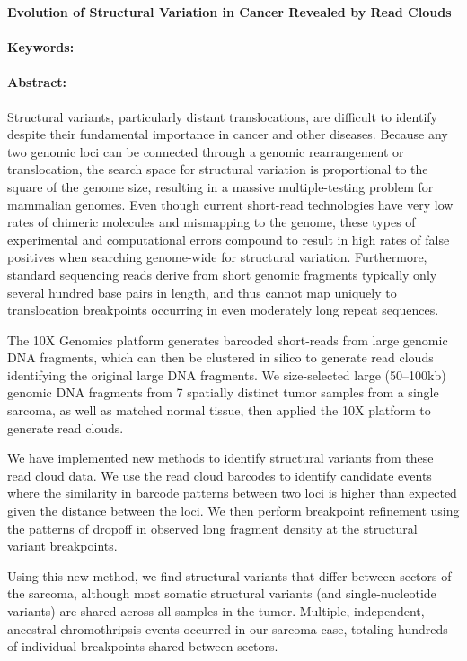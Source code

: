 \noindent
\large {\bf Evolution of Structural Variation in Cancer Revealed by Read Clouds} 


\normalsize 


\noindent \paragraph{Keywords:} 

\noindent \paragraph{Abstract:} 


Structural variants, particularly distant translocations, are
difficult to identify despite their fundamental importance in cancer and
other diseases. Because any two genomic loci can be connected through
a genomic rearrangement or translocation, the search space for structural
variation is proportional to the square of the genome size, resulting in a
massive multiple-testing problem for mammalian genomes. Even though
current short-read technologies have very low rates of chimeric molecules
and mismapping to the genome, these types of experimental and computational errors compound to result in high rates of false positives when
searching genome-wide for structural variation. Furthermore, standard sequencing reads derive from short genomic fragments typically only several
hundred base pairs in length, and thus cannot map uniquely to translocation
breakpoints occurring in even moderately long repeat sequences.

The 10X Genomics platform generates barcoded short-reads from
large genomic DNA fragments, which can then be clustered in silico to generate read clouds identifying the original large DNA fragments. We size-selected large (50–100kb) genomic DNA fragments from 7 spatially distinct
tumor samples from a single sarcoma, as well as matched normal tissue, then
applied the 10X platform to generate read clouds.

We have implemented new methods to identify structural variants from
these read cloud data. We use the read cloud barcodes to identify candidate
events where the similarity in barcode patterns between two loci is higher
than expected given the distance between the loci. We then perform breakpoint refinement using the patterns of dropoff in observed long fragment
density at the structural variant breakpoints.

Using this new method, we find structural variants that differ between
sectors of the sarcoma, although most somatic structural variants (and
single-nucleotide variants) are shared across all samples in the tumor. Multiple, independent, ancestral chromothripsis events occurred in our sarcoma
case, totaling hundreds of individual breakpoints shared between sectors.


